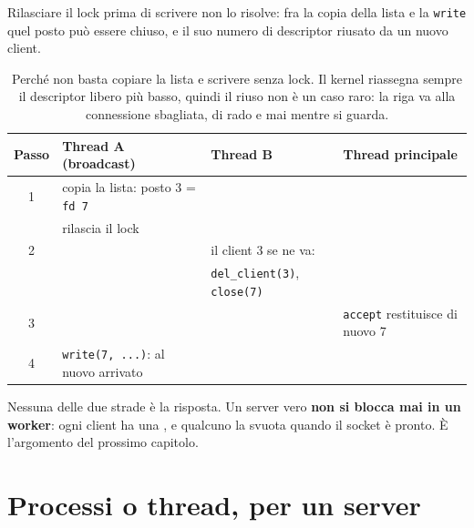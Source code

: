 
Rilasciare il lock prima di scrivere non lo risolve: fra la copia della lista e la \texttt{write} quel posto può essere
chiuso, e il suo numero di descriptor riusato da un nuovo client.

\begin{table}[H]
\centering
\begin{tabular}{c l l l}
\toprule
\textbf{Passo} & \textbf{Thread A (broadcast)} & \textbf{Thread B} & \textbf{Thread principale} \\
\midrule
1 & copia la lista: posto 3 = \texttt{fd 7} & & \\
  & rilascia il lock & & \\
2 & & il client 3 se ne va: & \\
  & & \texttt{del\_client(3)}, \texttt{close(7)} & \\
3 & & & \texttt{accept} restituisce di nuovo 7 \\
4 & \texttt{write(7, ...)}: al nuovo arrivato & & \\
\bottomrule
\end{tabular}
\caption{Perché non basta copiare la lista e scrivere senza lock. Il kernel riassegna sempre il descriptor libero più
         basso, quindi il riuso non è un caso raro: la riga va alla connessione sbagliata, di rado e mai mentre si guarda.}
\end{table}

Nessuna delle due strade è la risposta. Un server vero \textbf{non si blocca mai in un worker}: ogni client ha una
, e qualcuno la svuota quando il socket è pronto. È l'argomento del prossimo capitolo.

\section{Processi o thread, per un server}

